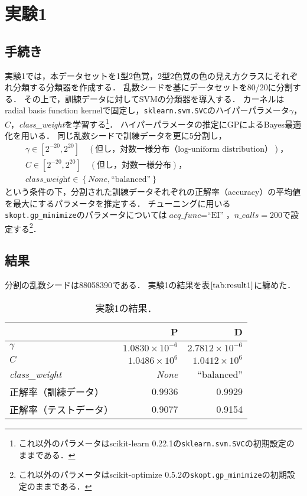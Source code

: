 \documentclass[uplatex,paper=a4,fontsize=4.0truemm,jafontsize=4.0truemm,head_space=30.0truemm,foot_space=30.0truemm,baselineskip=8.0truemm,line_length=40zw,gutter=25.0truemm,oneside,openany,fleqn,hanging_panctuation,open_bracket_pos=nibu_tentsuki,dvipdfmx,jis2004,book,titlepage]{jlreq}
\theoremstyle{mystyle}
\newcommand{\captiondot}[1]{\caption{#1．}}
\newcommand{\tableinput}[4]{\begin{table}[tbp]\centering\captiondot{#3}\label{tab:#4}\begin{tabular}{#1}#2\end{tabular}\end{table}}
\newcommand{\mathdisplaystyle}[1]{\(\displaystyle{#1}\)}
\newcommand{\Reference}[1]{\mathdisplaystyle{\ref{#1}}}
\newcommand{\negativevalue}[1]{{-#1}}
\newcommand{\parentheses}[1]{\left(#1\right)}
\newcommand{\braces}[1]{\left\{#1\right\}}
\newcommand{\squarebrackets}[1]{\left[#1\right]}
\begin{document}
		\section{実験1}
			\subsection{手続き}
				実験1では，本データセットを1型2色覚，2型2色覚の色の見え方クラスにそれぞれ分類する分類器を作成する．
				乱数シードを基にデータセットを80/20に分割する．
				その上で，訓練データに対してSVMの分類器を導入する．
				カーネルはradial basis function kernelで固定し，\texttt{sklearn{.}svm{.}SVC}のハイパーパラメータ\mathdisplaystyle{\gamma}，\mathdisplaystyle{C}，\textit{class\_weight}を学習する\footnote{これ以外のパラメータはscikit-learn 0.22.1の\texttt{sklearn{.}svm{.}SVC}の初期設定のままである．}．
				ハイパーパラメータの推定にGPによるBayes最適化を用いる．
				同じ乱数シードで訓練データを更に5分割し，
				\begin{align}
					&\gamma\in\squarebrackets{2^\negativevalue{20},2^{20}}\quad\parentheses{\textrm{但し，対数一様分布（log-uniform distribution）}}\textrm{，}\label{eq:gamma}\\
					&C\in\squarebrackets{2^\negativevalue{20},2^{20}}\quad\parentheses{\textrm{但し，対数一様分布}}\textrm{，}\label{eq:C}\\
					&\textit{class\_weight}\in\braces{\textit{None},\textrm{``balanced''}}\label{eq:classweight}
				\end{align}
				という条件の下，分割された訓練データそれぞれの正解率（accuracy）の平均値を最大にするパラメータを推定する．
				チューニングに用いる\texttt{skopt{.}gp\_minimize}のパラメータについては\mathdisplaystyle{\textit{acq\_func}=\textrm{``EI''}}，\mathdisplaystyle{\textit{n\_calls}=200}で設定する\footnote{これ以外のパラメータはscikit-optimize 0.5.2の\texttt{\texttt{skopt{.}gp\_minimize}}の初期設定のままである．}．
			\subsection{結果}
				分割の乱数シードは88058390である．
				実験1の結果を表\Reference{tab:result1}に纏めた．
				\tableinput{l|rr}{ & P & D \\ \hline
					\mathdisplaystyle{\gamma} & \mathdisplaystyle{1.0830\times{10}^{-6}} & \mathdisplaystyle{2.7812\times{10}^{-6}} \\
					\mathdisplaystyle{C} & \mathdisplaystyle{1.0486\times{10}^6} & \mathdisplaystyle{1.0412\times{10}^6} \\
					\textit{class\_weight} & \textit{None} & ``balanced'' \\
					正解率（訓練データ） & 0.9936 & 0.9929 \\
					正解率（テストデータ） & 0.9077 & 0.9154}{実験1の結果}{result1}
\end{document}
